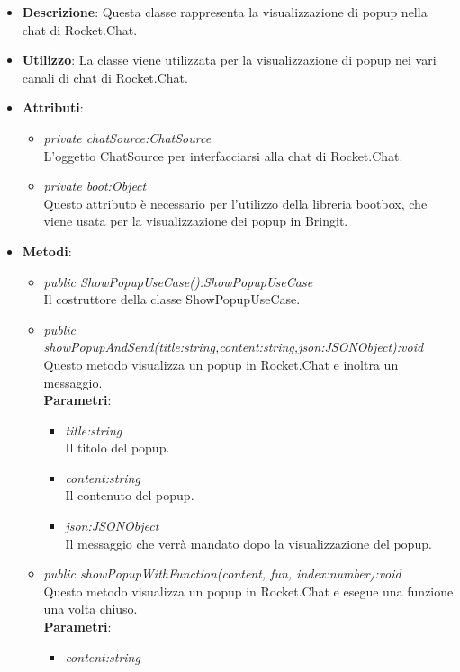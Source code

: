 \begin{itemize}
\item \textbf{Descrizione}: Questa classe rappresenta la visualizzazione di popup nella chat di Rocket.Chat.
\item \textbf{Utilizzo}: La classe viene utilizzata per la visualizzazione di popup nei vari canali di chat di Rocket.Chat.
\item \textbf{Attributi}: 
	\begin{itemize}
	\item \textit{private chatSource:ChatSource}\\
	L'oggetto ChatSource per interfacciarsi alla chat di Rocket.Chat.
	\item \textit{private boot:Object}\\
	Questo attributo è necessario per l'utilizzo della libreria bootbox, che viene usata per la visualizzazione dei popup in Bringit.
	\end{itemize}
\item \textbf{Metodi}:
	\begin{itemize}
	\item \textit{public ShowPopupUseCase():ShowPopupUseCase}\\
	Il costruttore della classe ShowPopupUseCase.
	\item \textit{public showPopupAndSend(title:string,content:string,json:JSONObject):void}\\
	Questo metodo visualizza un popup in Rocket.Chat e inoltra un messaggio.
			\\ \textbf{Parametri}: \begin{itemize}
				\item \textit{title:string}\\
				Il titolo del popup.
				\item \textit{content:string}\\
				Il contenuto del popup.
				\item \textit{json:JSONObject}\\
				Il messaggio che verrà mandato dopo la visualizzazione del popup.
			\end{itemize}
	\item \textit{public showPopupWithFunction(content, fun, index:number):void}\\
	Questo metodo visualizza un popup in Rocket.Chat e esegue una funzione una volta chiuso.
			\\ \textbf{Parametri}: \begin{itemize}
				\item \textit{content:string}\\

\end{itemize}
\end{itemize}
\end{itemize}
